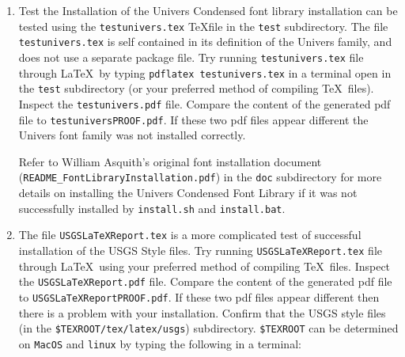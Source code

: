 \documentclass[11pt]{article}
\begin{document}
\begin{enumerate}
	\begin{enumerate}
	
		\item On \texttt{MacOS} and \texttt{Linux} you should see something like
		
		\begin{verbatim}
		  
		  Evaluate if USGS style files are available
		  Location of USGS LaTeX style files:  
		  /Users/jdhughes/Library/texmf/tex/latex/usgs/usgsreporta.sty
		\end{verbatim}
		
		\item On \texttt{Windows} you should see something like
		
		\begin{verbatim}
		
		  Evaluate if USGS style files are available
		  Location of USGS LaTeX style files:  
		  c:/texlive/texmf-local/tex/latex/usgs/usgsreporta.sty
		\end{verbatim}
	
	\end{enumerate}
	
	\item Test the Installation of the Univers Condensed font library installation can be tested using the \texttt{testunivers.tex} \TeX file in the \texttt{test} subdirectory. The file \texttt{testunivers.tex} is self contained in its definition of the Univers family, and does not use a separate package file. Try running \texttt{testunivers.tex} file through \LaTeX\ by typing \texttt{pdflatex testunivers.tex} in a terminal open in the \texttt{test} subdirectory (or your preferred method of compiling  \TeX~files). Inspect the \texttt{testunivers.pdf} file. Compare the content of the generated \textsf{pdf} file to \texttt{testuniversPROOF.pdf}. If these two \textsf{pdf} files appear different the Univers font family was not installed correctly. 
	
	Refer to William Asquith's original font installation document (\texttt{README\_FontLibraryInstallation.pdf}) in the \texttt{doc} subdirectory  for more details on installing the Univers Condensed Font Library if it was not successfully installed by \texttt{install.sh} and \texttt{install.bat}.
	
	\item The file \texttt{USGSLaTeXReport.tex} is a more complicated test of successful installation of the USGS Style files. Try running \texttt{USGSLaTeXReport.tex} file through \LaTeX\ using your preferred method of compiling  \TeX~files. Inspect the \texttt{USGSLaTeXReport.pdf} file. Compare the content of the generated \textsf{pdf} file to \texttt{USGSLaTeXReportPROOF.pdf}. If these two \textsf{pdf} files appear different then there is a problem with your installation. Confirm that the USGS style files (in the \texttt{\$TEXROOT/tex/latex/usgs}) subdirectory. \texttt{\$TEXROOT} can be determined on \texttt{MacOS} and \texttt{linux} by typing the following in a terminal:
	

\end{enumerate}
\end{document}
